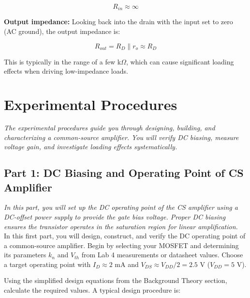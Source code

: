 \documentclass[10pt]{article}
\begin{document}
\begin{equation}
    R_{in} \approx \infty 
    \label{eq:rin_cs}
\end{equation}

\textbf{Output impedance:} Looking back into the drain with the input set to zero (AC ground), the output impedance is: 

\begin{equation}
    R_{out} = R_D \parallel r_o \approx R_D
    \label{eq:rout_cs}
\end{equation}

This is typically in the range of a few k$\Omega$, which can cause significant loading effects when driving low-impedance loads.

\section{Experimental Procedures}

\textit{The experimental procedures guide you through designing, building, and characterizing a common-source amplifier. You will verify DC biasing, measure voltage gain, and investigate loading effects systematically.} \\

\subsection{Part 1: DC Biasing and Operating Point of CS Amplifier}

\textit{In this part, you will set up the DC operating point of the CS amplifier using a DC-offset power supply to provide the gate bias voltage. Proper DC biasing ensures the transistor operates in the saturation region for linear amplification.} \\

In this first part, you will design, construct, and verify the DC operating point of a common-source amplifier. Begin by selecting your MOSFET and determining its parameters $k_n$ and $V_{th}$ from Lab 4 measurements or datasheet values. Choose a target operating point with $I_D \approx 2$ mA and $V_{DS} \approx V_{DD}/2 = 2.5$ V ($V_{DD} = 5$ V).

Using the simplified design equations from the Background Theory section, calculate the required values. A typical design procedure is:
\end{document}
